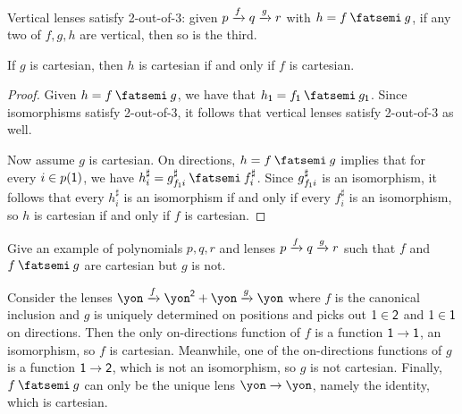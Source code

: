 \documentclass[Book-Poly]{subfiles}
\begin{document}

\begin{proposition}
Vertical lenses satisfy 2-out-of-3: given $p\xrightarrow{f}q\xrightarrow{g}r$ with $h = f \then g$, if any two of $f,g,h$ are vertical, then so is the third.

If $g$ is cartesian, then $h$ is cartesian if and only if $f$ is cartesian.
\end{proposition}
\begin{proof}
Given $h = f \then g$, we have that $h_\1 = f_\1 \then g_\1$.
Since isomorphisms satisfy 2-out-of-3, it follows that vertical lenses satisfy 2-out-of-3 as well.

Now assume $g$ is cartesian.
On directions, $h = f \then g$ implies that for every $i \in p(\textsf{1})$, we have $h^\sharp_i = g^\sharp_{f_\1i} \then f^\sharp_i$.
Since $g^\sharp_{f_{\textsf{1}}i}$ is an isomorphism, it follows that every $h^\sharp_i$ is an isomorphism if and only if every $f^\sharp_i$ is an isomorphism, so $h$ is cartesian if and only if $f$ is cartesian.
\end{proof}

\begin{exercise}
Give an example of polynomials $p,q,r$ and lenses $p\xrightarrow{f}q\xrightarrow{g}r$ such that $f$ and $f \then g$ are cartesian but $g$ is not.
\begin{solution}
Consider the lenses $\yon \To{f} \yon^\2 + \yon \To{g} \yon$ where $f$ is the canonical inclusion and $g$ is uniquely determined on positions and picks out $1 \in \textsf{2}$ and $1 \in \textsf{1}$ on directions.
Then the only on-directions function of $f$ is a function $\textsf{1} \to \textsf{1}$, an isomorphism, so $f$ is cartesian.
Meanwhile, one of the on-directions functions of $g$ is a function $\textsf{1} \to \textsf{2}$, which is not an isomorphism, so $g$ is not cartesian.
Finally, $f \then g$ can only be the unique lens $\yon \to \yon$, namely the identity, which is cartesian.
\end{solution}
\end{exercise}
\end{document}
